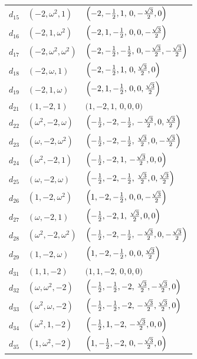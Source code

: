 \documentclass[%
  reprint,
  superscriptaddress,
  amsmath,amssymb,
  pra,
  floatfix,
  longbibliography
]{revtex4-2}
\begin{document}
\begin{longtable}{lll}
$d_{15}$ & $(-2,\omega^2,1)$ &
$\Bigl(-2,-\tfrac12,1,\,0,-\tfrac{\sqrt{3}}{2},0\Bigr)$ \\
$d_{16}$ & $(-2,1,\omega^2)$ &
$\Bigl(-2,1,-\tfrac12,\,0,0,-\tfrac{\sqrt{3}}{2}\Bigr)$ \\
$d_{17}$ & $(-2,\omega^2,\omega^2)$ &
$\Bigl(-2,-\tfrac12,-\tfrac12,\,0,-\tfrac{\sqrt{3}}{2},-\tfrac{\sqrt{3}}{2}\Bigr)$ \\
$d_{18}$ & $(-2,\omega,1)$ &
$\Bigl(-2,-\tfrac12,1,\,0,\tfrac{\sqrt{3}}{2},0\Bigr)$ \\
$d_{19}$ & $(-2,1,\omega)$ &
$\Bigl(-2,1,-\tfrac12,\,0,0,\tfrac{\sqrt{3}}{2}\Bigr)$ \\
$d_{21}$ & $(1,-2,1)$ &
$\bigl(1,-2,1,\,0,0,0\bigr)$ \\
$d_{22}$ & $(\omega^2,-2,\omega)$ &
$\Bigl(-\tfrac12,-2,-\tfrac12,\,-\tfrac{\sqrt{3}}{2},0,\tfrac{\sqrt{3}}{2}\Bigr)$ \\
$d_{23}$ & $(\omega,-2,\omega^2)$ &
$\Bigl(-\tfrac12,-2,-\tfrac12,\,\tfrac{\sqrt{3}}{2},0,-\tfrac{\sqrt{3}}{2}\Bigr)$ \\
$d_{24}$ & $(\omega^2,-2,1)$ &
$\Bigl(-\tfrac12,-2,1,\,-\tfrac{\sqrt{3}}{2},0,0\Bigr)$ \\
$d_{25}$ & $(\omega,-2,\omega)$ &
$\Bigl(-\tfrac12,-2,-\tfrac12,\,\tfrac{\sqrt{3}}{2},0,\tfrac{\sqrt{3}}{2}\Bigr)$ \\
$d_{26}$ & $(1,-2,\omega^2)$ &
$\Bigl(1,-2,-\tfrac12,\,0,0,-\tfrac{\sqrt{3}}{2}\Bigr)$ \\
$d_{27}$ & $(\omega,-2,1)$ &
$\Bigl(-\tfrac12,-2,1,\,\tfrac{\sqrt{3}}{2},0,0\Bigr)$ \\
$d_{28}$ & $(\omega^2,-2,\omega^2)$ &
$\Bigl(-\tfrac12,-2,-\tfrac12,\,-\tfrac{\sqrt{3}}{2},0,-\tfrac{\sqrt{3}}{2}\Bigr)$ \\
$d_{29}$ & $(1,-2,\omega)$ &
$\Bigl(1,-2,-\tfrac12,\,0,0,\tfrac{\sqrt{3}}{2}\Bigr)$ \\
$d_{31}$ & $(1,1,-2)$ &
$\bigl(1,1,-2,\,0,0,0\bigr)$ \\
$d_{32}$ & $(\omega,\omega^2,-2)$ &
$\Bigl(-\tfrac12,-\tfrac12,-2,\,\tfrac{\sqrt{3}}{2},-\tfrac{\sqrt{3}}{2},0\Bigr)$ \\
$d_{33}$ & $(\omega^2,\omega,-2)$ &
$\Bigl(-\tfrac12,-\tfrac12,-2,\,-\tfrac{\sqrt{3}}{2},\tfrac{\sqrt{3}}{2},0\Bigr)$ \\
$d_{34}$ & $(\omega^2,1,-2)$ &
$\Bigl(-\tfrac12,1,-2,\,-\tfrac{\sqrt{3}}{2},0,0\Bigr)$ \\
$d_{35}$ & $(1,\omega^2,-2)$ &
$\Bigl(1,-\tfrac12,-2,\,0,-\tfrac{\sqrt{3}}{2},0\Bigr)$ \\

\end{longtable}
\end{document}
